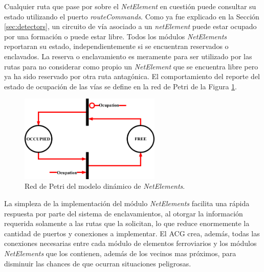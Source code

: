 	Cualquier ruta que pase por sobre el \textit{NetElement} en cuestión puede consultar su estado utilizando el puerto \textit{routeCommands}. Como ya fue explicado en la Sección \ref{sec:detectors}, un circuito de vía asociado a un \textit{netElement} puede estar ocupado por una formación o puede estar libre. Todos los módulos \textit{NetElements} reportaran su estado, independientemente si se encuentran reservados o enclavados. La reserva o enclavamiento es meramente para ser utilizado por las rutas para no considerar como propio un \textit{NetElement} que se encuentra libre pero ya ha sido reservado por otra ruta antagónica. El comportamiento del reporte del estado de ocupación de las vías se define en la red de Petri de la Figura \ref{fig:NET_Petri}.
	
	\begin{figure}[H]
		\centering
		\includegraphics[width=0.6\textwidth]{Figuras/NET_Petri}
		\centering\caption{Red de Petri del modelo dinámico de \textit{NetElements}.}
		\label{fig:NET_Petri}
	\end{figure}
	
	La simpleza de la implementación del módulo \textit{NetElements} facilita una rápida respuesta por parte del sistema de enclavamientos, al otorgar la información requerida solamente a las rutas que la solicitan, lo que reduce enormemente la cantidad de puertos y conexiones a implementar. El ACG crea, además, todas las conexiones necesarias entre cada módulo de elementos ferroviarios y los módulos \textit{NetElements} que los contienen, además de los vecinos mas próximos, para disminuir las chances de que ocurran situaciones peligrosas.